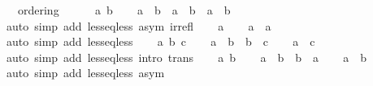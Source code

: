\begin{isabellebody}
\ \ \ {\isacartoucheopen}ordering\ {\isacharparenleft}{\kern0pt}\isactrlbold {\isasymle}{\isacharparenright}{\kern0pt}\ {\isacharparenleft}{\kern0pt}\isactrlbold {\isacharless}{\kern0pt}{\isacharparenright}{\kern0pt}{\isacartoucheclose}\isanewline
%
\isadelimproof
%
\endisadelimproof
%
\isatagproof
{}\isamarkupfalse%
\isanewline
\ \ \isamarkupfalse%
\ a\ b\isanewline
\ \ \isamarkupfalse%
\ {\isacartoucheopen}a\ \isactrlbold {\isacharless}{\kern0pt}\ b\ {\isasymlongleftrightarrow}\ a\ \isactrlbold {\isasymle}\ b\ {\isasymand}\ a\ {\isasymnoteq}\ b{\isacartoucheclose}\isanewline
\ \ \ \ \isamarkupfalse%
\ {\isacharparenleft}{\kern0pt}auto\ simp\ add{\isacharcolon}{\kern0pt}\ less{\isacharunderscore}{\kern0pt}eq{\isacharunderscore}{\kern0pt}less\ asym\ irrefl{\isacharparenright}{\kern0pt}\isanewline
{}\isamarkupfalse%
\isanewline
\ \ \isamarkupfalse%
\ a\isanewline
\ \ \isamarkupfalse%
\ {\isacartoucheopen}a\ \isactrlbold {\isasymle}\ a{\isacartoucheclose}\isanewline
\ \ \ \ \isamarkupfalse%
\ {\isacharparenleft}{\kern0pt}auto\ simp\ add{\isacharcolon}{\kern0pt}\ less{\isacharunderscore}{\kern0pt}eq{\isacharunderscore}{\kern0pt}less{\isacharparenright}{\kern0pt}\isanewline
{}\isamarkupfalse%
\isanewline
\ \ \isamarkupfalse%
\ a\ b\ c\isanewline
\ \ \isamarkupfalse%
\ {\isacartoucheopen}a\ \isactrlbold {\isasymle}\ b{\isacartoucheclose}\ \ {\isacartoucheopen}b\ \isactrlbold {\isasymle}\ c{\isacartoucheclose}\ \isamarkupfalse%
\ \isamarkupfalse%
\ {\isacartoucheopen}a\ \isactrlbold {\isasymle}\ c{\isacartoucheclose}\isanewline
\ \ \ \ \isamarkupfalse%
\ {\isacharparenleft}{\kern0pt}auto\ simp\ add{\isacharcolon}{\kern0pt}\ less{\isacharunderscore}{\kern0pt}eq{\isacharunderscore}{\kern0pt}less\ intro{\isacharcolon}{\kern0pt}\ trans{\isacharparenright}{\kern0pt}\isanewline
{}\isamarkupfalse%
\isanewline
\ \ \isamarkupfalse%
\ a\ b\isanewline
\ \ \isamarkupfalse%
\ {\isacartoucheopen}a\ \isactrlbold {\isasymle}\ b{\isacartoucheclose}\ \ {\isacartoucheopen}b\ \isactrlbold {\isasymle}\ a{\isacartoucheclose}\ \isamarkupfalse%
\ \isamarkupfalse%
\ {\isacartoucheopen}a\ {\isacharequal}{\kern0pt}\ b{\isacartoucheclose}\isanewline
\ \ \ \ \isamarkupfalse%
\ {\isacharparenleft}{\kern0pt}auto\ simp\ add{\isacharcolon}{\kern0pt}\ less{\isacharunderscore}{\kern0pt}eq{\isacharunderscore}{\kern0pt}less\ asym{\isacharparenright}{\kern0pt}\isanewline

\end{isabellebody}
